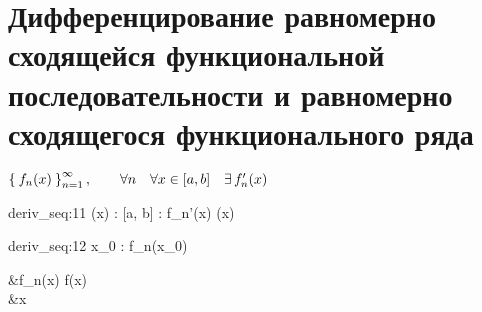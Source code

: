 \section{Дифференцирование равномерно сходящейся функциональной последовательности и равномерно сходящегося функционального ряда}

\begin{theorem}
	$ \Set{f_n(x)}_{n=1}^{\infty}, \qquad \forall n \quad \forall x \in [a, b] \quad \exists\, f_n'(x) $
	\begin{equ}{deriv_seq:11}
		\exist \vphi(x) : [a, b]  \to \R : \quad f_n'(x)  \vphi(x)
	\end{equ}
	\begin{equ}{deriv_seq:12}
		\exist x_0 \in [a, b] : \quad \exist {} f_n(x_0) \in \R
	\end{equ}
	\begin{mequ}
		&f_n(x)  f(x) \\
		 &\forall x \in [a, b] \quad \exist {}
	\end{mequ}
\end{theorem}

